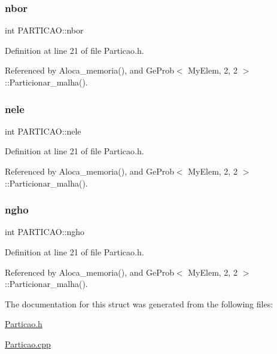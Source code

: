 \mbox{\label{structPARTICAO_a8e5312eb634675d39d52fd2f999b66c4}} 
\subsubsection{\texorpdfstring{nbor}{nbor}}
{\footnotesize\ttfamily int P\+A\+R\+T\+I\+C\+A\+O\+::nbor}



Definition at line 21 of file Particao.\+h.



Referenced by Aloca\+\_\+memoria(), and Ge\+Prob$<$ My\+Elem, 2, 2 $>$\+::\+Particionar\+\_\+malha().

\mbox{\label{structPARTICAO_a8465cb3d4cbe1aec08d4ed2901d7e9c3}} 
\subsubsection{\texorpdfstring{nele}{nele}}
{\footnotesize\ttfamily int P\+A\+R\+T\+I\+C\+A\+O\+::nele}



Definition at line 21 of file Particao.\+h.



Referenced by Aloca\+\_\+memoria(), and Ge\+Prob$<$ My\+Elem, 2, 2 $>$\+::\+Particionar\+\_\+malha().

\mbox{\label{structPARTICAO_a99fe0b2dd7b5315525d69831a5ef36c2}} 
\subsubsection{\texorpdfstring{ngho}{ngho}}
{\footnotesize\ttfamily int P\+A\+R\+T\+I\+C\+A\+O\+::ngho}



Definition at line 21 of file Particao.\+h.



Referenced by Aloca\+\_\+memoria(), and Ge\+Prob$<$ My\+Elem, 2, 2 $>$\+::\+Particionar\+\_\+malha().



The documentation for this struct was generated from the following files\+:\begin{DoxyCompactItemize}
\item 
\hyperlink{Particao_8h}{Particao.\+h}\item 
\hyperlink{Particao_8cpp}{Particao.\+cpp}\end{DoxyCompactItemize}
